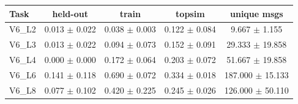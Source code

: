 \begin{tabular}{lcccc}
\toprule
Task & held-out & train & topsim & unique msgs \\
\midrule
V6\_L2 & 0.013 $\pm$ 0.022 & 0.038 $\pm$ 0.003 & 0.122 $\pm$ 0.084 & 9.667 $\pm$ 1.155 \\
V6\_L3 & 0.013 $\pm$ 0.022 & 0.094 $\pm$ 0.073 & 0.152 $\pm$ 0.091 & 29.333 $\pm$ 19.858 \\
V6\_L4 & 0.000 $\pm$ 0.000 & 0.172 $\pm$ 0.064 & 0.203 $\pm$ 0.072 & 51.667 $\pm$ 19.858 \\
V6\_L6 & 0.141 $\pm$ 0.118 & 0.690 $\pm$ 0.072 & 0.334 $\pm$ 0.018 & 187.000 $\pm$ 15.133 \\
V6\_L8 & 0.077 $\pm$ 0.102 & 0.420 $\pm$ 0.225 & 0.245 $\pm$ 0.026 & 126.000 $\pm$ 50.110 \\
\bottomrule
\end{tabular}
